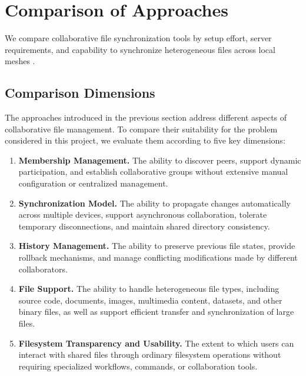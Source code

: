 \section{Comparison of Approaches}
We compare collaborative file synchronization tools by setup effort, server requirements, and capability to synchronize heterogeneous files across local meshes \cite{googledrive,dropbox,gitbook,github,syncthing,resilio}.


\subsection{Comparison Dimensions}

The approaches introduced in the previous section address
different aspects of collaborative file management. To compare
their suitability for the problem considered in this project,
we evaluate them according to five key dimensions:

\begin{enumerate}
    \item \textbf{Membership Management.}
    The ability to discover peers, support dynamic participation, and establish collaborative groups without extensive manual configuration or centralized management.

    \item \textbf{Synchronization Model.}
    The ability to propagate changes automatically across multiple devices, support asynchronous collaboration, tolerate temporary disconnections, and maintain shared directory consistency.

    \item \textbf{History Management.}
    The ability to preserve previous file states, provide rollback mechanisms, and manage conflicting modifications made by different collaborators.

    \item \textbf{File Support.}
    The ability to handle heterogeneous file types, including source code, documents, images, multimedia content, datasets, and other binary files, as well as support efficient transfer and synchronization of large files.

    \item \textbf{Filesystem Transparency and Usability.}
    The extent to which users can interact with shared files through ordinary filesystem operations without requiring specialized workflows, commands, or collaboration tools.
\end{enumerate}

